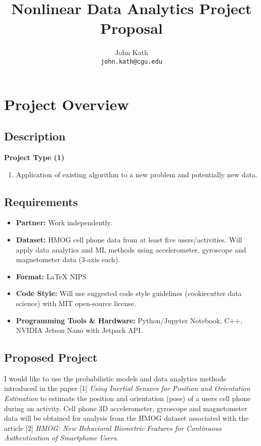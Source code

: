 \documentclass{article}
\title{Nonlinear Data Analytics Project Proposal}
\author{
  John Kath \\
  \texttt{john.kath@cgu.edu} \\
}
\begin{document}
\maketitle


\section{Project Overview}

\subsection{Description}

\textbf{Project Type (1)}

\begin{enumerate}
  \item Application of existing algorithm to a new problem and
    potentially new data.
\end{enumerate}

\subsection{Requirements}

\begin{itemize}
  \item \textbf{Partner:} Work independently.
  \item \textbf{Dataset:} HMOG cell phone data from at least five
    users/activities. Will apply data analytics and ML methods using
    accelerometer, gyroscope and magnetometer data (3-axis each).
  \item \textbf{Format:} \LaTeX{} NIPS
  \item \textbf{Code Style:} Will use suggested code style guidelines
    (cookiecutter data science) with MIT open-source license.
  \item \textbf{Programming Tools \& Hardware:} Python/Jupyter
    Notebook, C++, NVIDIA Jetson Nano with Jetpack API.
\end{itemize}

\subsection{Proposed Project}

I would like to use the probabilistic models and data analytics methods
introduced in the paper [1] \textit{Using Inertial Sensors for Position
and Orientation Estimation} to estimate the position and orientation
(pose) of a users cell phone during an activity. Cell phone 3D
accelerometer, gyroscope and magnetometer data will be obtained for
analysis from the HMOG dataset associated with the article [2]
\textit{HMOG: New Behavioral Biometric Features for Continuous
Authentication of Smartphone Users}.
\end{document}
